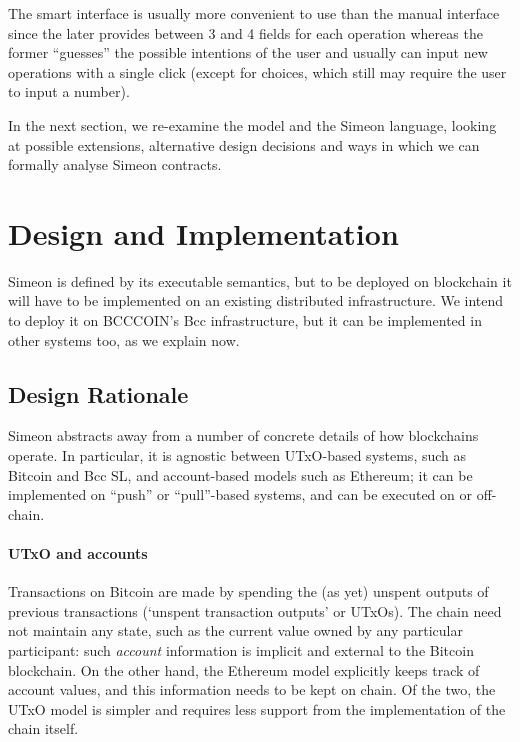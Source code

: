 \documentclass[runningheads]{llncs}
\begin{document}
The smart interface is usually more convenient to use than the manual
interface since the later provides between 3 and 4 fields for each
operation whereas the former ``guesses'' the possible intentions
of the user and usually can input new operations with a single click 
(except for choices, which still may require the user to input a number).


In the next section, we re-examine the model and the Simeon language, looking at possible extensions, alternative 
design decisions and ways in which we can formally analyse Simeon contracts.




\section{Design and Implementation}
\label{section:towards-implementation}

Simeon is defined by its executable semantics, but to be deployed on blockchain it will have to be implemented on an 
existing distributed infrastructure.  We intend to deploy it on BCCCOIN's Bcc infrastructure, but it can be implemented 
in other systems too, as we explain now.

\subsection{Design Rationale}
\label{sec:abstraction}
\label{sec:design-rationale}

Simeon abstracts away from a number of concrete details of how blockchains operate. In particular, it is agnostic 
between UTxO-based systems, such as Bitcoin and Bcc SL, and account-based models such as Ethereum; it can be 
implemented on ``push'' or ``pull''-based systems, and can be executed on or off-chain. 

\paragraph{UTxO and accounts}

Transactions on Bitcoin are made by spending the (as yet) unspent outputs of 
previous transactions (`unspent transaction outputs' or UTxOs). The chain need not maintain any state, such as the 
current value owned by any particular participant: such \emph{account} information is implicit and external to the 
Bitcoin blockchain. On the other hand, the Ethereum model explicitly keeps track of account values, and  this 
information needs to be kept on chain. Of the two, the UTxO model is simpler and requires less support from the 
implementation of the chain itself.
\end{document}
